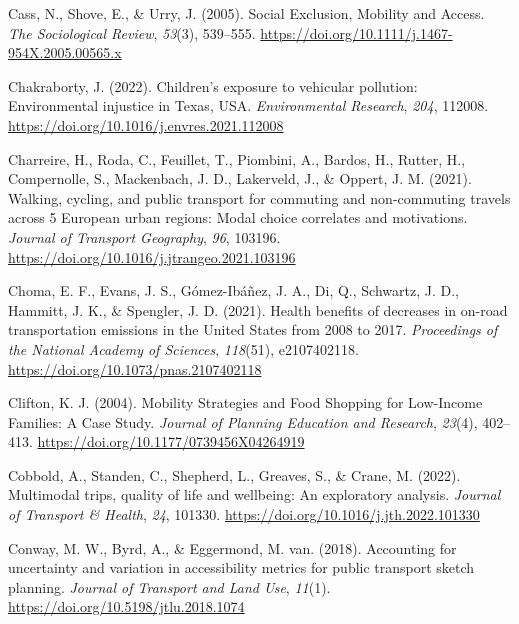 \documentclass[
  letterpaper,
  authoryear,
  review,
  3p]{elsarticle}
\newlength{\cslhangindent}
\newlength{\cslentryspacingunit} %
\newenvironment{CSLReferences}[2] %
 {%
  \setlength{\parindent}{0pt}
  \ifodd #1
  \let\oldpar\par
  \def\par{\hangindent=\cslhangindent\oldpar}
  \fi
  \setlength{\parskip}{#2\cslentryspacingunit}
 }%
 {}
\begin{document}
\begin{CSLReferences}{1}{0}
\leavevmode{}%
Cass, N., Shove, E., \& Urry, J. (2005). Social {Exclusion}, {Mobility}
and {Access}. \emph{The Sociological Review}, \emph{53}(3), 539--555.
\url{https://doi.org/10.1111/j.1467-954X.2005.00565.x}

\leavevmode{}%
Chakraborty, J. (2022). Children's exposure to vehicular pollution:
{Environmental} injustice in {Texas}, {USA}. \emph{Environmental
Research}, \emph{204}, 112008.
\url{https://doi.org/10.1016/j.envres.2021.112008}

\leavevmode{}%
Charreire, H., Roda, C., Feuillet, T., Piombini, A., Bardos, H., Rutter,
H., Compernolle, S., Mackenbach, J. D., Lakerveld, J., \& Oppert, J. M.
(2021). Walking, cycling, and public transport for commuting and
non-commuting travels across 5 {European} urban regions: {Modal} choice
correlates and motivations. \emph{Journal of Transport Geography},
\emph{96}, 103196. \url{https://doi.org/10.1016/j.jtrangeo.2021.103196}

\leavevmode{}%
Choma, E. F., Evans, J. S., Gómez-Ibáñez, J. A., Di, Q., Schwartz, J.
D., Hammitt, J. K., \& Spengler, J. D. (2021). Health benefits of
decreases in on-road transportation emissions in the {United States}
from 2008 to 2017. \emph{Proceedings of the National Academy of
Sciences}, \emph{118}(51), e2107402118.
\url{https://doi.org/10.1073/pnas.2107402118}

\leavevmode{}%
Clifton, K. J. (2004). Mobility {Strategies} and {Food Shopping} for
{Low-Income Families}: {A Case Study}. \emph{Journal of Planning
Education and Research}, \emph{23}(4), 402--413.
\url{https://doi.org/10.1177/0739456X04264919}

\leavevmode{}%
Cobbold, A., Standen, C., Shepherd, L., Greaves, S., \& Crane, M.
(2022). Multimodal trips, quality of life and wellbeing: {An}
exploratory analysis. \emph{Journal of Transport \& Health}, \emph{24},
101330. \url{https://doi.org/10.1016/j.jth.2022.101330}

\leavevmode{}%
Conway, M. W., Byrd, A., \& Eggermond, M. van. (2018). Accounting for
uncertainty and variation in accessibility metrics for public transport
sketch planning. \emph{Journal of Transport and Land Use}, \emph{11}(1).
\url{https://doi.org/10.5198/jtlu.2018.1074}


\end{CSLReferences}
\end{document}
